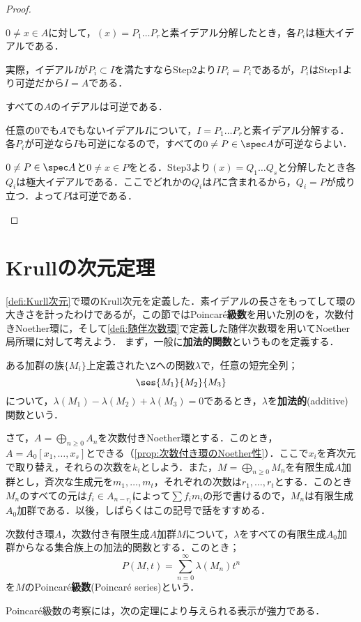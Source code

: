 \begin{proof}
\begin{step}
		\item $0\neq x\in A$に対して，$(x)=P_1\dots P_r$と素イデアル分解したとき，各$P_i$は極大イデアルである．
		
		実際，イデアル$I$が$P_i\subset I$を満たすならStep2より$IP_i=P_i$であるが，$P_i$はStep1より可逆だから$I=A$である．
		
		\item すべての$A$のイデアルは可逆である．
		
		任意の0でも$A$でもないイデアル$I$について，$I=P_1\dots P_r$と素イデアル分解する．各$P_i$が可逆なら$I$も可逆になるので，すべての$0\neq P\in\spec A$が可逆ならよい．
		
		$0\neq P\in\spec A$と$0\neq x\in P$をとる．Step3より$(x)=Q_1\dots Q_s$と分解したとき各$Q_i$は極大イデアルである．ここでどれかの$Q_i$は$P$に含まれるから，$Q_i=P$が成り立つ．よって$P$は可逆である．
	\end{step}
\end{proof}

\section{Krullの次元定理}
\ref{defi:Kurll次元}で環のKrull次元を定義した．素イデアルの長さをもってして環の大きさを計ったわけであるが，この節ではPoincar\'e\textbf{級数}を用いた別のを，次数付きNoether環に，そして\ref{defi:随伴次数環}で定義した随伴次数環を用いてNoether局所環に対して考えよう．
まず，一般に\textbf{加法的関数}というものを定義する．
\begin{defi}[加法的関数]
	ある加群の族$\{M_i\}$上定義された$\Z$への関数$\lambda$で，任意の短完全列；
	\[\ses{M_1}{M_2}{M_3}\]
	について，$\lambda(M_1)-\lambda(M_2)+\lambda(M_3)=0$であるとき，$\lambda$を\textbf{加法的}(additive)関数という．
\end{defi}

さて，$A=\bigoplus_{n\geq0}A_n$を次数付きNoether環とする．このとき，$A=A_0[x_1,\dots,x_s]$とできる（\ref{prop:次数付き環のNoether性}）．ここで$x_i$を斉次元で取り替え，それらの次数を$k_i$としよう．また，$M=\bigoplus_{n\geq0}M_n$を有限生成$A$加群とし，斉次な生成元を$m_1,\dots,m_t$，それぞれの次数は$r_1,\dots,r_t$とする．このとき$M_n$のすべての元は$f_i\in A_{n-r_i}$によって$\sum f_im_i$の形で書けるので，$M_n$は有限生成$A_0$加群である．以後，しばらくはこの記号で話をすすめる．

\begin{defi}
	次数付き環$A$，次数付き有限生成$A$加群$M$について，$\lambda$をすべての有限生成$A_0$加群からなる集合族上の加法的関数とする．このとき；
	\[P(M,t)=\sum_{n=0}^\infty \lambda(M_n)t^n\]
	を$M$のPoincar\'e\textbf{級数}(Poincar\'e series)という．
\end{defi}
Poincar\'e級数の考察には，次の定理により与えられる表示が強力である．

